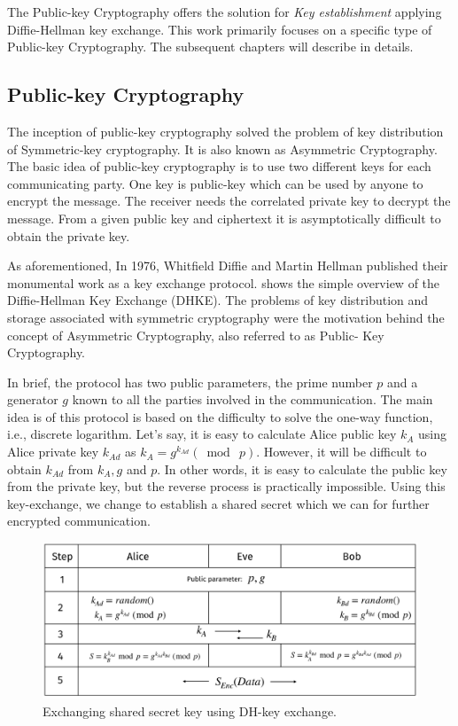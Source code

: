 The Public-key Cryptography offers the solution for \textit{Key establishment} applying Diffie-Hellman key exchange.
This work primarily focuses on a specific type of Public-key Cryptography. 
The subsequent chapters will describe in details.

\subsection{Public-key Cryptography}
\label{ch1_subsec_pkc}
The inception of public-key cryptography solved the problem of key distribution of Symmetric-key cryptography.
It is also known as Asymmetric Cryptography.
The basic idea of public-key cryptography is to use two different keys for each communicating party.
One key is public-key which can be used by anyone to encrypt the message. 
The receiver needs the correlated private key to decrypt the message.
From a given public key and ciphertext it is asymptotically difficult to obtain the private key.

As aforementioned, In 1976, Whitfield Diffie and Martin Hellman published their monumental work as a key exchange  protocol\cite{diffie1976new}.  
 shows the simple overview of the Diffie-Hellman Key Exchange (DHKE).
The problems of key distribution and storage associated with symmetric cryptography were the motivation behind the concept of Asymmetric Cryptography, also referred to as Public- Key Cryptography. 

In brief, the protocol has two public parameters, the prime number $p$ and a generator $g$ known to all the parties involved in the communication.
The main idea is of this protocol is based on the difficulty to solve the one-way function, i.e., discrete logarithm.
Let's say, it is easy to calculate Alice public key $k_A$ using Alice private key $k_{Ad}$ as $k_A = g^{k_{Ad}} (\bmod ~p).$ 
However, it will be difficult to obtain $k_{Ad}$ from $k_A, g$ and $p$.
In other words, it is easy to calculate the public key from the private key, but the reverse process is practically impossible.
Using this key-exchange, we change to establish a shared secret which we can for further encrypted communication.

  \begin{figure}
	\centering
	\includegraphics[width=.9\linewidth, height=.67\textheight, keepaspectratio]{Figures/DHKE}
	\caption{Exchanging shared secret key using DH-key exchange.}
	\label{fig_DHKE}
\end{figure}

